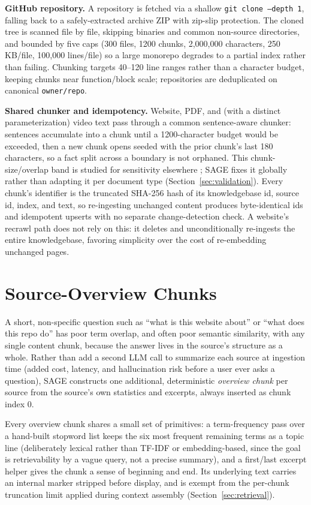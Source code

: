 \documentclass[conference]{IEEEtran}
\begin{document}
\textbf{GitHub repository.} A repository is fetched via a shallow \texttt{git clone --depth 1}, falling back to a safely-extracted archive ZIP with zip-slip protection. The cloned tree is scanned file by file, skipping binaries and common non-source directories, and bounded by five caps (300 files, 1200 chunks, 2{,}000{,}000 characters, 250\,KB/file, 100{,}000 lines/file) so a large monorepo degrades to a partial index rather than failing. Chunking targets 40--120 line ranges rather than a character budget, keeping chunks near function/block scale; repositories are deduplicated on canonical \texttt{owner/repo}.

\textbf{Shared chunker and idempotency.} Website, PDF, and (with a distinct parameterization) video text pass through a common sentence-aware chunker: sentences accumulate into a chunk until a 1200-character budget would be exceeded, then a new chunk opens seeded with the prior chunk's last 180 characters, so a fact split across a boundary is not orphaned. This chunk-size/overlap band is studied for sensitivity elsewhere \cite{jimenoyepes2024chunking}; SAGE fixes it globally rather than adapting it per document type (Section~\ref{sec:validation}). Every chunk's identifier is the truncated SHA-256 hash of its knowledgebase id, source id, index, and text, so re-ingesting unchanged content produces byte-identical ids and idempotent upserts with no separate change-detection check. A website's recrawl path does not rely on this: it deletes and unconditionally re-ingests the entire knowledgebase, favoring simplicity over the cost of re-embedding unchanged pages.

\section{Source-Overview Chunks}
\label{sec:overview}

A short, non-specific question such as ``what is this website about'' or ``what does this repo do'' has poor term overlap, and often poor semantic similarity, with any single content chunk, because the answer lives in the source's structure as a whole. Rather than add a second LLM call to summarize each source at ingestion time (added cost, latency, and hallucination risk before a user ever asks a question), SAGE constructs one additional, deterministic \emph{overview chunk} per source from the source's own statistics and excerpts, always inserted as chunk index 0.

Every overview chunk shares a small set of primitives: a term-frequency pass over a hand-built stopword list keeps the six most frequent remaining terms as a topic line (deliberately lexical rather than TF-IDF or embedding-based, since the goal is retrievability by a vague query, not a precise summary), and a first/last excerpt helper gives the chunk a sense of beginning and end. Its underlying text carries an internal marker stripped before display, and is exempt from the per-chunk truncation limit applied during context assembly (Section~\ref{sec:retrieval}).
\end{document}
